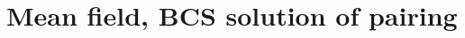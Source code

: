 \documentclass[a4paper,14pt]{book}
\begin{document}
 \setcounter{chapter}{6}

\chapter{Mean field, BCS solution of pairing}
%
%
%
%
%
%
%
%
%
%
%
%
%
%
%
%
\end{document}
